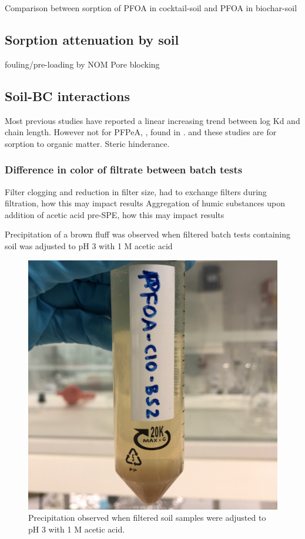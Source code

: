 Comparison between sorption of PFOA in cocktail-soil and PFOA in biochar-soil

\subsection{Sorption attenuation by soil}
fouling/pre-loading by NOM
Pore blocking

\subsection{Soil-BC interactions}
Most previous studies have reported a linear increasing trend between log Kd and chain length. However not for PFPeA, \citep{zhang2013sorption}, found in \citep{Sorengard2019}. and \citep{guelfo2013}  these studies are for sorption to organic matter.  Steric hinderance. 

\subsubsection{Difference in color of filtrate between batch tests}
Filter clogging and reduction in filter size, had to exchange filters during filtration, how this may impact results
Aggregation of humic substances upon addition of acetic acid pre-SPE, how this may impact results

Precipitation of a brown fluff was observed when filtered batch tests containing soil was adjusted to pH 3 with 1 M acetic acid

\begin{figure}
    \centering
    \includegraphics[width=0.6\linewidth,scale=0.6]{Bilder/Samples/Precipitation.jpg}
    \caption{Precipitation observed when filtered soil samples were adjusted to pH 3 with 1 M acetic acid.}
    \label{fig:precip}
\end{figure}

